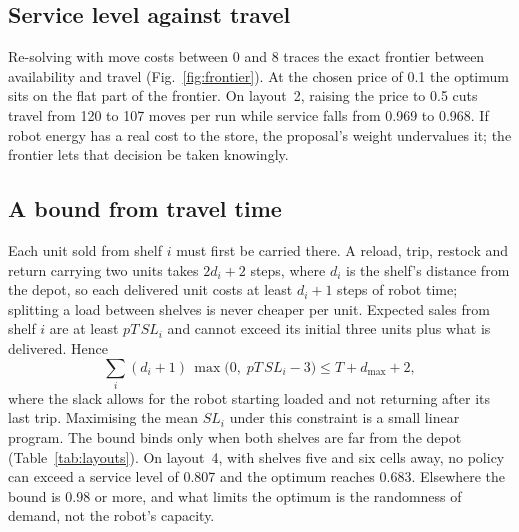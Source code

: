 \subsection{Service level against travel}
\label{sec:frontier}
Re-solving with move costs between 0 and 8 traces the exact frontier between availability and travel (Fig.~\ref{fig:frontier}). At the chosen price of 0.1 the optimum sits on the flat part of the frontier. On layout~2, raising the price to 0.5 cuts travel from 120 to 107 moves per run while service falls from 0.969 to 0.968. If robot energy has a real cost to the store, the proposal's weight undervalues it; the frontier lets that decision be taken knowingly.

\subsection{A bound from travel time}
\label{sec:bound}
Each unit sold from shelf $i$ must first be carried there. A reload, trip, restock and return carrying two units takes $2d_i+2$ steps, where $d_i$ is the shelf's distance from the depot, so each delivered unit costs at least $d_i+1$ steps of robot time; splitting a load between shelves is never cheaper per unit. Expected sales from shelf $i$ are at least $pT\,SL_i$ and cannot exceed its initial three units plus what is delivered. Hence
\begin{equation}
\sum_i (d_i+1)\,\max\bigl(0,\; pT\,SL_i-3\bigr) \le T + d_{\max} + 2 ,
\end{equation}
where the slack allows for the robot starting loaded and not returning after its last trip. Maximising the mean $SL_i$ under this constraint is a small linear program. The bound binds only when both shelves are far from the depot (Table~\ref{tab:layouts}). On layout~4, with shelves five and six cells away, no policy can exceed a service level of 0.807 and the optimum reaches 0.683. Elsewhere the bound is 0.98 or more, and what limits the optimum is the randomness of demand, not the robot's capacity.
